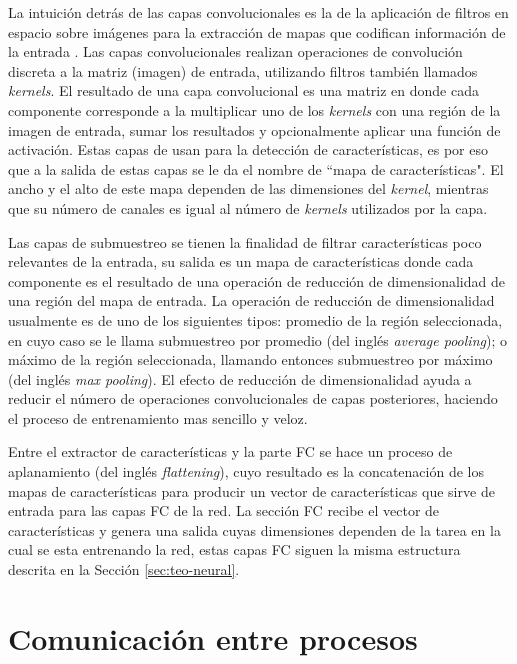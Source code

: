 La intuición detrás de las capas convolucionales es la de la aplicación de filtros en espacio sobre imágenes para la extracción de mapas que codifican información de la entrada \cite{Gupta2013} \cite{Coady2019}. Las capas convolucionales realizan operaciones de convolución discreta a la matriz (imagen) de entrada, utilizando filtros también llamados \textit{kernels}. El resultado de una capa convolucional es una matriz en donde cada componente corresponde a la multiplicar uno de los \textit{kernels} con una región de la imagen de entrada, sumar los resultados y opcionalmente aplicar una función de activación. Estas capas de usan para la detección de características, es por eso que a la salida de estas capas se le da el nombre de ``mapa de características". El ancho y el alto de este mapa dependen de las dimensiones del \textit{kernel}, mientras que su número de canales es igual al número de \textit{kernels} utilizados por la capa.

Las capas de submuestreo se tienen la finalidad de filtrar características poco relevantes de la entrada, su salida es un mapa de características donde cada componente es el resultado de una operación de reducción de dimensionalidad de una región del mapa de entrada. La operación de reducción de dimensionalidad usualmente es de uno de los siguientes tipos: promedio de la región seleccionada, en cuyo caso se le llama submuestreo por promedio (del inglés \textit{average pooling}); o máximo de la región seleccionada, llamando entonces submuestreo por máximo (del inglés \textit{max pooling}). El efecto de reducción de dimensionalidad ayuda a reducir el número de operaciones convolucionales de capas posteriores, haciendo el proceso de entrenamiento mas sencillo y veloz.

Entre el extractor de características y la parte FC se hace un proceso de aplanamiento (del inglés \textit{flattening}), cuyo resultado es la concatenación de los mapas de características para producir un vector de características que sirve de entrada para las capas FC de la red. La sección FC recibe el vector de características y genera una salida cuyas dimensiones dependen de la tarea en la cual se esta entrenando la red, estas capas FC siguen la misma estructura descrita en la Sección \ref{sec:teo-neural}.

\section{Comunicación entre procesos}
\label{sec:teo-interprocess}

